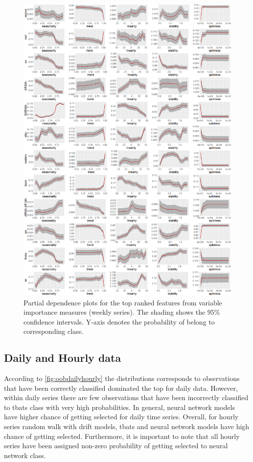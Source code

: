 \documentclass[11pt,a4paper,]{article}
\begin{document}
\begin{figure}
\centering
\includegraphics{figures/weeklypdp-1.png}
\caption{\label{fig:weeklypdp}Partial dependence plots for the top ranked
features from variable importance measures (weekly series). The shading
shows the 95\% confidence intervals. Y-axis denotes the probability of
belong to corresponding class.}
\end{figure}

\newpage

\subsection{Daily and Hourly data}\label{daily-and-hourly-data}

According to \autoref{fig:oobdailyhourly} the distributions corresponds
to observations that have been correctly classified dominated the top
for daily data. However, within daily series there are few observations
that have been incorrectly classified to tbats class with very high
probabilities. In general, neural network models have higher chance of
getting selected for daily time series. Overall, for hourly series
random walk with drift models, tbats and neural network models have high
chance of getting selected. Furthermore, it is important to note that
all hourly series have been assigned non-zero probability of getting
selected to neural network class.
\end{document}
